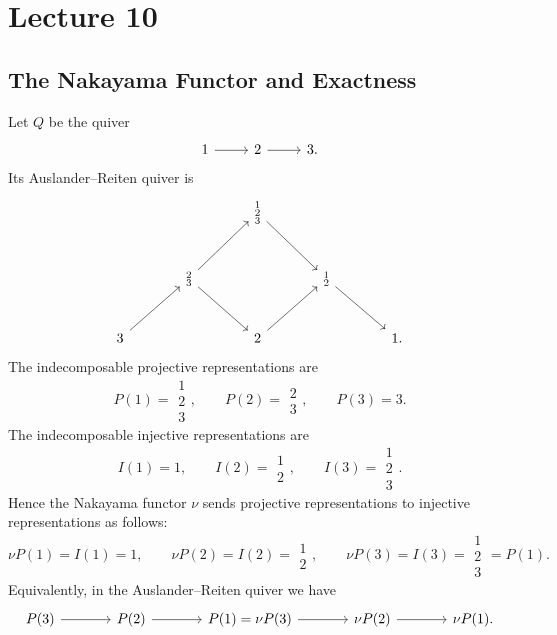 \documentclass[11pt, a4paper]{report}
\begin{document}
\chapter{Lecture 10}

\section{The Nakayama Functor and Exactness}

\begin{example}
Let \(Q\) be the quiver
\[
\begin{tikzcd}
1 \arrow[r] & 2 \arrow[r] & 3 .
\end{tikzcd}
\]
Its Auslander--Reiten quiver is
\[
\begin{tikzcd}[column sep=large, row sep=large]
&& \substack{1\\2\\3} \arrow[dr] && \\
& \substack{2\\3} \arrow[ur] \arrow[dr] && \substack{1\\2} \arrow[dr] & \\
3 \arrow[ur] && 2 \arrow[ur] && 1 .
\end{tikzcd}
\]
The indecomposable projective representations are
\[
P(1)=\substack{1\\2\\3},
\qquad
P(2)=\substack{2\\3},
\qquad
P(3)=3.
\]
The indecomposable injective representations are
\[
I(1)=1,
\qquad
I(2)=\substack{1\\2},
\qquad
I(3)=\substack{1\\2\\3}.
\]
Hence the Nakayama functor \(\nu\) sends projective representations to injective
representations as follows:
\[
\nu P(1)=I(1)=1,
\qquad
\nu P(2)=I(2)=\substack{1\\2},
\qquad
\nu P(3)=I(3)=\substack{1\\2\\3}=P(1).
\]
Equivalently, in the Auslander--Reiten quiver we have
\[
\begin{tikzcd}[column sep=large, row sep=large]
P(3) \arrow[r] & P(2) \arrow[r] & P(1)=\nu P(3) \arrow[r] & \nu P(2) \arrow[r] & \nu P(1).
\end{tikzcd}
\]
\end{example}
\end{document}
